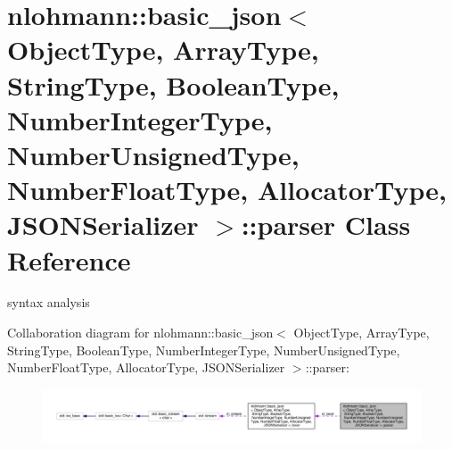 \hypertarget{classnlohmann_1_1basic__json_1_1parser}{}\section{nlohmann\+:\+:basic\+\_\+json$<$ Object\+Type, Array\+Type, String\+Type, Boolean\+Type, Number\+Integer\+Type, Number\+Unsigned\+Type, Number\+Float\+Type, Allocator\+Type, J\+S\+O\+N\+Serializer $>$\+:\+:parser Class Reference}
\label{classnlohmann_1_1basic__json_1_1parser}


syntax analysis  




Collaboration diagram for nlohmann\+:\+:basic\+\_\+json$<$ Object\+Type, Array\+Type, String\+Type, Boolean\+Type, Number\+Integer\+Type, Number\+Unsigned\+Type, Number\+Float\+Type, Allocator\+Type, J\+S\+O\+N\+Serializer $>$\+:\+:parser\+:\nopagebreak
\begin{figure}[H]
\begin{center}
\leavevmode
\includegraphics[width=350pt]{classnlohmann_1_1basic__json_1_1parser__coll__graph}
\end{center}
\end{figure}
